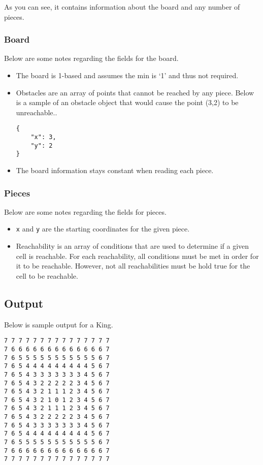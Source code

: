 \documentclass[a4paper]{article}
\begin{document}
As you can see, it contains information about the board and any number of
pieces.

\subsubsection*{Board}
\label{sec-1-4-1}
Below are some notes regarding the fields for the board.

\begin{itemize}
\item The board is 1-based and assumes the min is `1' and thus not required.
\item Obstacles are an array of points that cannot be reached by any
piece. Below is a sample of an obstacle object that would cause the point
(3,2) to be unreachable..

\begin{verbatim}
{
    "x": 3,
    "y": 2
}
\end{verbatim}
\item The board information stays constant when reading each piece.
\end{itemize}

\subsubsection*{Pieces}
\label{sec-1-4-2}
Below are some notes regarding the fields for pieces.

\begin{itemize}
\item \verb~x~ and \verb~y~ are the starting coordinates for the given piece.
\item Reachability is an array of conditions that are used to determine if a
given cell is reachable. For each reachability, all conditions must be met
in order for it to be reachable. However, not all reachabilities must be
hold true for the cell to be reachable.
\end{itemize}

\subsection*{Output}
\label{sec-1-5}
Below is sample output for a King.

\begin{verbatim}
7 7 7 7 7 7 7 7 7 7 7 7 7 7 7
7 6 6 6 6 6 6 6 6 6 6 6 6 6 7
7 6 5 5 5 5 5 5 5 5 5 5 5 6 7
7 6 5 4 4 4 4 4 4 4 4 4 5 6 7
7 6 5 4 3 3 3 3 3 3 3 4 5 6 7
7 6 5 4 3 2 2 2 2 2 3 4 5 6 7
7 6 5 4 3 2 1 1 1 2 3 4 5 6 7
7 6 5 4 3 2 1 0 1 2 3 4 5 6 7
7 6 5 4 3 2 1 1 1 2 3 4 5 6 7
7 6 5 4 3 2 2 2 2 2 3 4 5 6 7
7 6 5 4 3 3 3 3 3 3 3 4 5 6 7
7 6 5 4 4 4 4 4 4 4 4 4 5 6 7
7 6 5 5 5 5 5 5 5 5 5 5 5 6 7
7 6 6 6 6 6 6 6 6 6 6 6 6 6 7
7 7 7 7 7 7 7 7 7 7 7 7 7 7 7
\end{verbatim}
\end{document}
